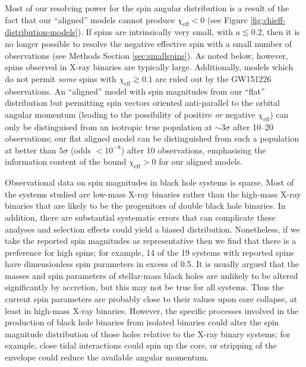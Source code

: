 \documentclass{nature}
\newcommand{\chieff}{\chi_\mathrm{eff}}
\begin{document}
Most of our resolving power for the spin angular distribution is a
result of the fact that our ``aligned'' models cannot produce
$\chieff < 0$ (see Figure \ref{fig:chieff-distribution-models}).  If
spins are intrinsically very small, with $a \lesssim 0.2$, then it is
no longer possible to resolve the negative effective spin with a small
number of observations (see Methods Section \ref{sec:smallspins}).  As
noted below, however, spins observed in X-ray binaries are typically
large.  Additionally, models which do not permit \emph{some} spins
with $\chieff \gtrsim 0.1$ are ruled out by the GW151226
observations\cite{2016PhRvL.116x1103A}.  An ``aligned'' model with
spin magnitudes from our ``flat'' distribution but permitting spin
vectors oriented anti-parallel to the orbital angular momentum
(leading to the possibility of positive \emph{or} negative $\chieff$)
can only be distinguised from an isotropic true population at
$\sim 3 \sigma$ after 10--20 observations\cite{2017CQGra..34cLT01V};
our flat aligned model can be distinguished from such a population at
better than $5\sigma$ (odds $< 10^{-8}$) after 10 observations,
emphasising the information content of the bound $\chieff > 0$ for our
aligned models.

Observational data on spin magnitudes in black hole systems is
sparse\cite{2015PhR...548....1M}.  Most of the systems studied are
low-mass X-ray binaries rather than the high-mass X-ray binaries that
are likely to be the progenitors of double black hole binaries.  In
addition, there are substantial systematic errors that can complicate
these analyses\cite{2015PhR...548....1M} and selection effects could
yield a biased distribution. Nonetheless, if we take the reported spin
magnitudes as representative then we find that there is a preference
for high spins; for example, 14 of the 19 systems with reported spins
have dimensionless spin parameters in excess of 0.5.  It is usually
argued that the masses and spin parameters of stellar-mass black holes
are unlikely to be altered significantly by
accretion\cite{1999MNRAS.305..654K}, but this may not be true for all
systems\cite{2003MNRAS.341..385P,2015ApJ...800...17F}.  Thus the
current spin parameters are probably close to their values upon core
collapse, at least in high-mass X-ray binaries.  However, the specific
processes involved in the production of black hole binaries from
isolated binaries could alter the spin magnitude distribution of those
holes relative to the X-ray binary systems; for example, close tidal
interactions could spin up the core, or stripping of the envelope
could reduce the available angular
momentum\cite{2016MNRAS.462..844K,2017arXiv170203952H}.
\end{document}
